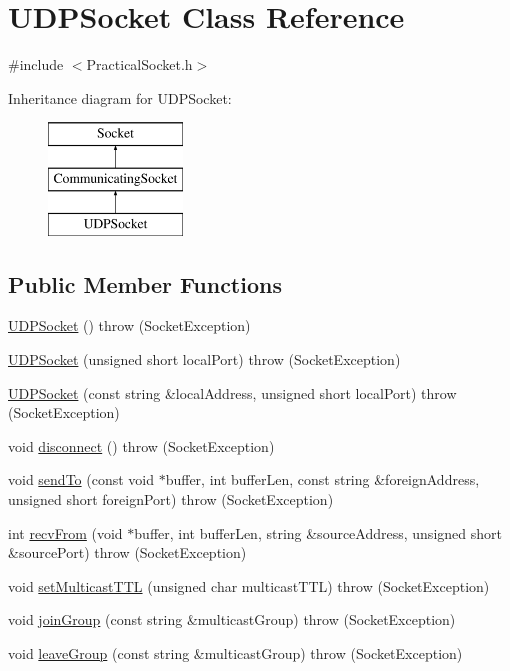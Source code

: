 \hypertarget{classUDPSocket}{\section{U\-D\-P\-Socket Class Reference}
\label{classUDPSocket}
}


{\ttfamily \#include $<$Practical\-Socket.\-h$>$}

Inheritance diagram for U\-D\-P\-Socket\-:\begin{figure}[H]
\begin{center}
\leavevmode
\includegraphics[height=3.000000cm]{classUDPSocket}
\end{center}
\end{figure}
\subsection*{Public Member Functions}
\begin{DoxyCompactItemize}
\item 
\hyperlink{classUDPSocket_a4f86f3023f5a08f6355802599a10e100}{U\-D\-P\-Socket} ()  throw (\-Socket\-Exception)
\item 
\hyperlink{classUDPSocket_a14dcb55c4b60b12d4a7fff648cbb825f}{U\-D\-P\-Socket} (unsigned short local\-Port)  throw (\-Socket\-Exception)
\item 
\hyperlink{classUDPSocket_af19281c523f15ed30d7d78f09033713d}{U\-D\-P\-Socket} (const string \&local\-Address, unsigned short local\-Port)  throw (\-Socket\-Exception)
\item 
void \hyperlink{classUDPSocket_a7482e8e61cef160e1a7c0d6ac15c01be}{disconnect} ()  throw (\-Socket\-Exception)
\item 
void \hyperlink{classUDPSocket_a41a3595e226f273953cbd38618af5d5b}{send\-To} (const void $\ast$buffer, int buffer\-Len, const string \&foreign\-Address, unsigned short foreign\-Port)  throw (\-Socket\-Exception)
\item 
int \hyperlink{classUDPSocket_abcd5c064e2496bd8b1888fd4e1b68949}{recv\-From} (void $\ast$buffer, int buffer\-Len, string \&source\-Address, unsigned short \&source\-Port)  throw (\-Socket\-Exception)
\item 
void \hyperlink{classUDPSocket_a4dcfff33b45d1b84b5a602fc6f4a27f8}{set\-Multicast\-T\-T\-L} (unsigned char multicast\-T\-T\-L)  throw (\-Socket\-Exception)
\item 
void \hyperlink{classUDPSocket_a1b20c1e8bd49a9bd9b53dd4f1c8d4c11}{join\-Group} (const string \&multicast\-Group)  throw (\-Socket\-Exception)
\item 
void \hyperlink{classUDPSocket_a78835eaeca8a5ac039b4579c795e3640}{leave\-Group} (const string \&multicast\-Group)  throw (\-Socket\-Exception)
\end{DoxyCompactItemize}
